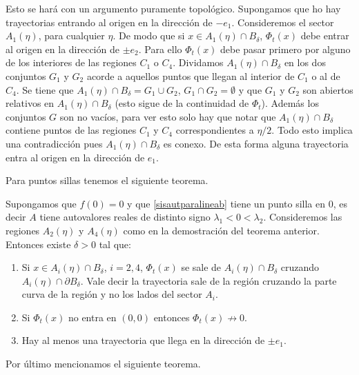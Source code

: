 \begin{demo}
 Esto se hará con
un argumento puramente topológico. Supongamos que ho hay
trayectorias entrando al origen en la dirección de $-e_1$.
Consideremos el sector $A_1(\eta)$, para cualquier $\eta$. De modo
que si $x\in A_1(\eta)\cap B_{\delta}$, $\Phi_t(x)$ debe entrar al
origen en la dirección de $\pm e_2$. Para ello $\Phi_t(x)$ debe
pasar primero por alguno de los interiores de las regiones $C_1$ o
$C_4$. Dividamos $A_1(\eta)\cap B_{\delta}$ en los dos conjuntos
$G_1$ y $G_2$ acorde a aquellos puntos que llegan al interior de
$C_1$ o al de $C_4$. Se tiene que $A_1(\eta)\cap
B_{\delta}=G_1\cup G_2$, $G_1\cap G_2=\emptyset$ y que $G_1$ y
$G_2$ son abiertos relativos en $A_1(\eta)\cap B_{\delta}$ (esto
sigue de la continuidad de $\Phi_t$). Además los conjuntos $G$ son
no vacíos, para ver esto solo hay que notar que $A_1(\eta)\cap
B_{\delta}$ contiene puntos de las regiones $C_1$ y $C_4$
correspondientes a $\eta/2$. Todo esto implica una contradicción
pues $A_1(\eta)\cap B_{\delta}$ es conexo. De esta forma alguna
trayectoria entra al origen en la dirección de $e_1$.\end{demo}


Para puntos sillas tenemos el siguiente teorema.

\begin{teorema}[Sillas]\label{teoremalineasillas} Supongamos que $f(0)=0$ y que
\eqref{sisautparalineab} tiene un punto silla en $0$, es decir $A$
tiene autovalores reales de distinto signo
$\lambda_1<0<\lambda_2$. Consideremos las regiones $A_2(\eta)$ y
$A_4(\eta)$ como en la demostración del teorema anterior. Entonces
existe $\delta>0$ tal que:

\begin{enumerate}
       \item\label{inc1b}  Si       $x\in A_i(\eta)\cap B_{\delta}$, $i=2,4$, $\Phi_t(x)$
       se sale de  $A_i(\eta)\cap
       B_{\delta}$ cruzando  $A_i(\eta)\cap \partial B_{\delta}$.
       Vale decir la trayectoria  sale de la región
       cruzando la parte curva de la región y no los lados del
       sector $A_i$.
        \item\label{inc2b} Si  $\Phi_t(x)$ no entra en $(0,0)$ entonces $\Phi_t(x)\nrightarrow 0$.
        \item\label{inc3b}  Hay al menos una trayectoria que llega en la dirección de
        $\pm e_1$.
\end{enumerate}
\end{teorema}


Por último mencionamos el siguiente teorema.

